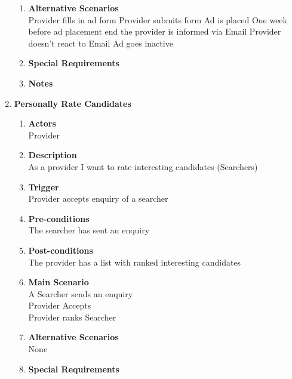 \documentclass{scrreprt}
\begin{document}
\begin{enumerate}
\begin{enumerate}
		\item \textbf{Alternative Scenarios} \\
			Provider fills in ad form
			Provider submits form
			Ad is placed
			One week before ad placement end the provider is informed via Email
			Provider doesn’t react to Email
			Ad goes inactive
		\item \textbf{Special Requirements} \\

		\item \textbf{Notes} \\
	\end{enumerate}


	\item \textbf{Personally Rate Candidates}
	\begin{enumerate}
		\item \textbf{Actors}  \\
			Provider\\

		\item \textbf{Description} \\
			As a provider I want to rate interesting candidates (Searchers)\\
			
		\item \textbf{Trigger} \\
			Provider accepts enquiry of a searcher\\

		\item \textbf{Pre-conditions} \\
			The searcher has sent an enquiry\\

		\item \textbf{Post-conditions} \\
			The provider has a list with ranked interesting candidates\\

		\item \textbf{Main Scenario} \\
			A Searcher sends an enquiry\\
			Provider Accepts\\
			Provider ranks Searcher\\

		\item \textbf{Alternative Scenarios} \\
			None\\
		\item \textbf{Special Requirements} \\


\end{enumerate}
\end{enumerate}
\end{document}
